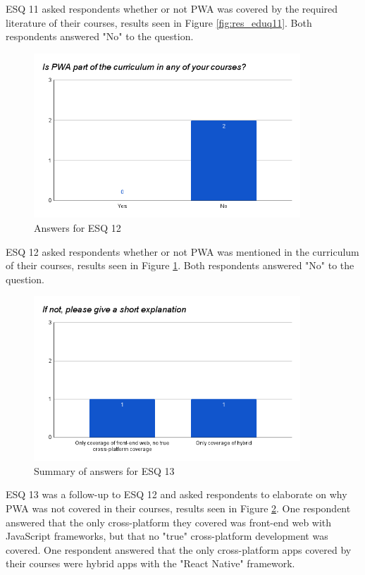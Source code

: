 \documentclass[a4paper,12pt]{article}
\begin{document}
ESQ 11 asked respondents whether or not PWA was covered by the required literature of their courses, results seen in Figure \ref{fig:res_eduq11}. Both respondents answered "No" to the question.

\begin{figure}[ht!]
    \centering
    \includegraphics[width=10cm]{img/Results/esq12.png}
    \caption{Answers for ESQ 12}
    \label{fig:res_eduq12}
\end{figure}

\newpage
ESQ 12 asked respondents whether or not PWA was mentioned in the curriculum of their courses, results seen in Figure \ref{fig:res_eduq12}. Both respondents answered "No" to the question.

\begin{figure}[ht!]
    \centering
    \includegraphics[width=10cm]{img/Results/esq13.png}
    \caption{Summary of answers for ESQ 13}
    \label{fig:res_eduq13}
\end{figure}

ESQ 13 was a follow-up to ESQ 12 and asked respondents to elaborate on why PWA was not covered in their courses, results seen in Figure \ref{fig:res_eduq13}. One respondent answered that the only cross-platform they covered was front-end web with JavaScript frameworks, but that no "true" cross-platform development was covered. One respondent answered that the only cross-platform apps covered by their courses were hybrid apps with the "React Native" framework.
\end{document}
